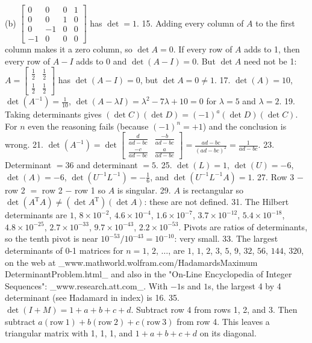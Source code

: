(b) \(\left[\begin{array}{cccc}0&0&0&1\\ 0&0&1&0\\ 0&-1&0&0\\ -1&0&0&0\end{array}\right]\) has \(\det=1\).
15. Adding every column of \(A\) to the first column makes it a zero column, so \(\det A=0\). If every row of \(A\) adds to 1, then every row of \(A-I\) adds to 0 and \(\det(A-I)=0\). But \(\det A\) need not be 1: \(A=\left[\begin{array}{rr}\frac{1}{2}&\frac{1}{2}\\ \frac{1}{2}&\frac{1}{2}\end{array}\right]\) has \(\det(A-I)=0\), but \(\det A=0\neq 1\).
17. \(\det(A)=10\), \(\det(A^{-1})=\frac{1}{10}\), \(\det(A-\lambda I)=\lambda^{2}-7\lambda+10=0\) for \(\lambda=5\) and \(\lambda=2\).
19. Taking determinants gives \((\det C)(\det D)=(-1)^{a}(\det D)(\det C)\). For \(n\) even the reasoning fails (because \((-1)^{n}=+1\)) and the conclusion is wrong.
21. \(\det(A^{-1})=\det\left[\begin{array}{cc}\frac{d}{ad-bc}&\frac{-b}{ad-bc}\\ \frac{-c}{ad-bc}&\frac{a}{ad-bc}\end{array}\right]=\frac{ad-bc}{(ad-bc)^{2}}= \frac{1}{ad-bc}\).
23. Determinant \(=36\) and determinant \(=5\).
25. \(\det(L)=1\), \(\det(U)=-6\), \(\det(A)=-6\), \(\det(U^{-1}L^{-1})=-\frac{1}{6}\), and \(\det(U^{-1}L^{-1}A)=1\).
27. Row 3 \(-\) row 2 \(=\) row 2 \(-\) row 1 so \(A\) is singular.
29. \(A\) is rectangular so \(\det(A^{\mathrm{T}}A)\neq(\det A^{\mathrm{T}})(\det A)\): these are not defined.
31. The Hilbert determinants are \(1\), \(8\times 10^{-2}\), \(4.6\times 10^{-4}\), \(1.6\times 10^{-7}\), \(3.7\times 10^{-12}\), \(5.4\times 10^{-18}\), \(4.8\times 10^{-25}\), \(2.7\times 10^{-33}\), \(9.7\times 10^{-43}\), \(2.2\times 10^{-53}\). Pivots are ratios of determinants, so the tenth pivot is near \(10^{-53}/10^{-43}=10^{-10}\): very small.
33. The largest determinants of 0-1 matrices for \(n=1\), \(2\), \(\dots\), are \(1\), \(1\), \(2\), \(3\), \(5\), \(9\), \(32\), \(56\), \(144\), \(320\), on the web at _www.mathworld.wolfram.com/HadamardsMaximum DeterminantProblem.html_ and also in the "On-Line Encyclopedia of Integer Sequences": _www.research.att.com_. With \(-1\)s and \(1\)s, the largest 4 by 4 determinant (see Hadamard in index) is 16.
35. \(\det(I+M)=1+a+b+c+d\). Subtract row 4 from rows 1, 2, and 3. Then subtract \(a(\mathrm{row}\ 1)+b(\mathrm{row}\ 2)+c(\mathrm{row}\ 3)\) from row 4. This leaves a triangular matrix with 1, 1, 1, and \(1+a+b+c+d\) on its diagonal.

